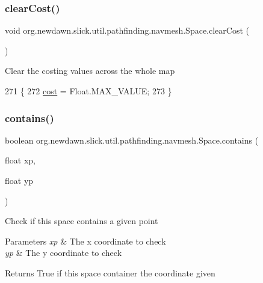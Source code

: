 \subsubsection{\texorpdfstring{clear\+Cost()}{clearCost()}}
{\footnotesize\ttfamily void org.\+newdawn.\+slick.\+util.\+pathfinding.\+navmesh.\+Space.\+clear\+Cost (\begin{DoxyParamCaption}{ }\end{DoxyParamCaption})\hspace{0.3cm}{\ttfamily [inline]}}

Clear the costing values across the whole map 
\begin{DoxyCode}
271                             \{
272         \mbox{\hyperlink{classorg_1_1newdawn_1_1slick_1_1util_1_1pathfinding_1_1navmesh_1_1_space_a9807ff26ac70231463426ebbaf4b8dac}{cost}} = Float.MAX\_VALUE;
273     \}
\end{DoxyCode}
\mbox{\label{classorg_1_1newdawn_1_1slick_1_1util_1_1pathfinding_1_1navmesh_1_1_space_ac1da8845acf1cb7e44642a2815079c86}} 
\subsubsection{\texorpdfstring{contains()}{contains()}}
{\footnotesize\ttfamily boolean org.\+newdawn.\+slick.\+util.\+pathfinding.\+navmesh.\+Space.\+contains (\begin{DoxyParamCaption}\item[{float}]{xp,  }\item[{float}]{yp }\end{DoxyParamCaption})\hspace{0.3cm}{\ttfamily [inline]}}

Check if this space contains a given point


\begin{DoxyParams}{Parameters}
{\em xp} & The x coordinate to check \\
\hline
{\em yp} & The y coordinate to check \\
\hline
\end{DoxyParams}
\begin{DoxyReturn}{Returns}
True if this space container the coordinate given 
\end{DoxyReturn}

